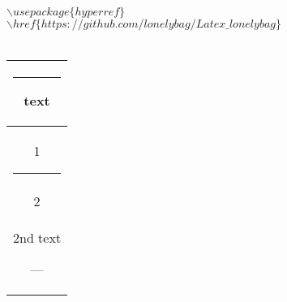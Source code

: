 \documentclass{article}
\begin{document}
\noindent$\backslash usepackage\{hyperref\}$\\
$\backslash href\{https://github.com/lonelybag/Latex\_lonelybag\}$
\\
\\
\begin{tabular}{|c|}
    \hline
    \rule[-1em]{1em}{1ex}text \\
    \hline
    \LARGE{1}\rule[-7pt]{1pt}{28pt}   \\
    \hline
    \Large{2}                        \\
    \hline
    2nd text\strut---         \\
    \hline
\end{tabular}
\end{document}
